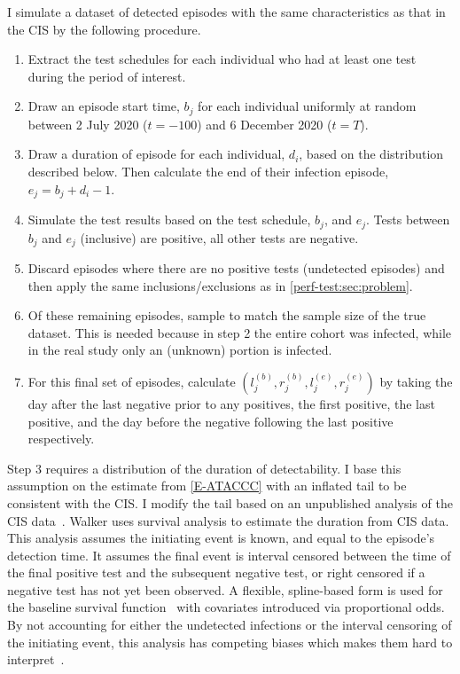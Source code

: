 \documentclass[thesis.tex]{subfiles}
\begin{document}
I simulate a dataset of detected episodes with the same characteristics as that in the CIS by the following procedure.
\begin{enumerate}
    \item Extract the test schedules for each individual who had at least one test during the period of interest.
    \item Draw an episode start time, $b_{j}$ for each individual uniformly at random between 2 July 2020 ($t = -100$) and 6 December 2020 ($t = T$).
    \item Draw a duration of episode for each individual, $d_i$, based on the distribution described below. Then calculate the end of their infection episode, $e_{j} = b_{j} + d_i - 1$.
    \item Simulate the test results based on the test schedule, $b_{j}$, and $e_{j}$. Tests between $b_{j}$ and $e_{j}$ (inclusive) are positive, all other tests are negative.
    \item Discard episodes where there are no positive tests (\ie undetected episodes) and then apply the same inclusions/exclusions as in \cref{perf-test:sec:problem}.
    \item Of these remaining episodes, sample  to match the sample size of the true dataset. This is needed because in step 2 the entire cohort was infected, while in the real study only an (unknown) portion is infected.
    \item For this final set of episodes, calculate $(l_j^{(b)}, r_j^{(b)}, l_j^{(e)}, r_j^{(e)})$ by taking the day after the last negative prior to any positives, the first positive, the last positive, and the day before the negative following the last positive respectively.
\end{enumerate}

Step 3 requires a distribution of the duration of detectability.
I base this assumption on the estimate from \cref{E-ATACCC} with an inflated tail to be consistent with the CIS.
I modify the tail based on an unpublished analysis of the CIS data~.
Walker uses survival analysis to estimate the duration from CIS data.
This analysis assumes the initiating event is known, and equal to the episode’s detection time. 
It assumes the final event is interval censored between the time of the final positive test and the subsequent negative test, or right censored if a negative test has not yet been observed.
A flexible, spline-based form is used for the baseline survival function~\autocite{roystonSTPM,roystonFlexible} with covariates introduced via proportional odds.
By not accounting for either the undetected infections or the interval censoring of the initiating event, this analysis has competing biases which makes them hard to interpret~\autocite{cisMethodsONS}.
\end{document}
